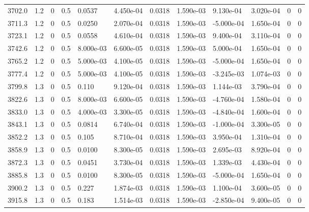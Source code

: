 \documentclass[preview]{standalone}
\begin{document}
{{{{{{{{\begin{tabular}{L{1.2cm}C{1.2cm} C{0.3cm}C{0.5cm} C{1.4cm}C{1.4cm} C{1.4cm}C{1.4cm} C{1.6cm}C{1.6cm} C{1.6cm}C{1.6cm}}
  3702.0  &   1.2  & 0     & 0.5 &  0.0537  & 4.450e-04  &  0.0318&   1.590e-03& 9.130e-04 & 3.020e-04   &  0 & 0  \\ 
  3711.3  &   1.2  & 0     & 0.5 &  0.0250  & 2.070e-04  &  0.0318&   1.590e-03& -5.000e-04 & 1.650e-04   &  0 & 0  \\ 
  3723.1  &   1.2  & 0     & 0.5 &  0.0558  & 4.610e-04  &  0.0318&   1.590e-03& 9.400e-04 & 3.110e-04   &  0 & 0  \\ 
  3742.6  &   1.2  & 0     & 0.5 &  8.000e-03  & 6.600e-05  &  0.0318&   1.590e-03& 5.000e-04 & 1.650e-04   &  0 & 0  \\ 
  3765.2  &   1.2  & 0     & 0.5 &  5.000e-03  & 4.100e-05  &  0.0318&   1.590e-03& -5.000e-04 & 1.650e-04   &  0 & 0  \\ 
  3777.4  &   1.2  & 0     & 0.5 &  5.000e-03  & 4.100e-05  &  0.0318&   1.590e-03& -3.245e-03 & 1.074e-03   &  0 & 0  \\ 
  3799.8  &   1.3  & 0     & 0.5 &  0.110  & 9.120e-04  &  0.0318&   1.590e-03& 1.144e-03 & 3.790e-04   &  0 & 0  \\ 
  3822.6  &   1.3  & 0     & 0.5 &  8.000e-03  & 6.600e-05  &  0.0318&   1.590e-03& -4.760e-04 & 1.580e-04   &  0 & 0  \\ 
  3833.0  &   1.3  & 0     & 0.5 &  4.000e-03  & 3.300e-05  &  0.0318&   1.590e-03& -4.840e-04 & 1.600e-04   &  0 & 0  \\ 
  3843.1  &   1.3  & 0     & 0.5 &  0.0814  & 6.740e-04  &  0.0318&   1.590e-03& -1.000e-04 & 3.300e-05   &  0 & 0  \\ 
  3852.2  &   1.3  & 0     & 0.5 &  0.105  & 8.710e-04  &  0.0318&   1.590e-03& 3.950e-04 & 1.310e-04   &  0 & 0  \\ 
  3858.9  &   1.3  & 0     & 0.5 &  0.0100  & 8.300e-05  &  0.0318&   1.590e-03& 2.695e-03 & 8.920e-04   &  0 & 0  \\ 
  3872.3  &   1.3  & 0     & 0.5 &  0.0451  & 3.730e-04  &  0.0318&   1.590e-03& 1.339e-03 & 4.430e-04   &  0 & 0  \\ 
  3885.8  &   1.3  & 0     & 0.5 &  0.0100  & 8.300e-05  &  0.0318&   1.590e-03& -5.000e-04 & 1.650e-04   &  0 & 0  \\ 
  3900.2  &   1.3  & 0     & 0.5 &  0.227  & 1.874e-03  &  0.0318&   1.590e-03& 1.100e-04 & 3.600e-05   &  0 & 0  \\ 
  3915.8  &   1.3  & 0     & 0.5 &  0.183  & 1.514e-03  &  0.0318&   1.590e-03& -2.850e-04 & 9.400e-05   &  0 & 0  \\ 
\hline 
\end{tabular} 

}}}}}}}}
\end{document}
